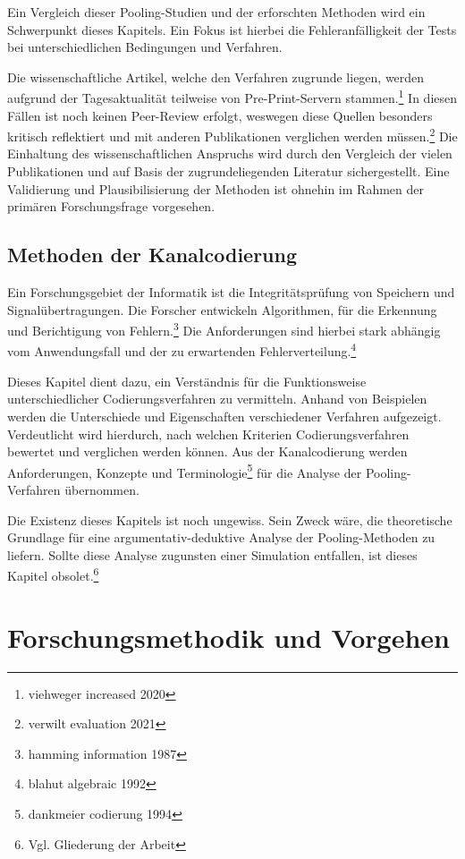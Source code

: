 Ein Vergleich dieser Pooling-Studien und der erforschten Methoden wird ein Schwerpunkt dieses Kapitels.
Ein Fokus ist hierbei die Fehleranfälligkeit der Tests bei unterschiedlichen Bedingungen und Verfahren.

Die wissenschaftliche Artikel, welche den Verfahren zugrunde liegen, werden aufgrund der Tagesaktualität teilweise von Pre-Print-Servern stammen.\footnote{viehweger increased 2020}
In diesen Fällen ist noch keinen Peer-Review erfolgt, weswegen diese Quellen besonders kritisch reflektiert und mit anderen Publikationen verglichen werden müssen.\footnote{verwilt evaluation 2021}
Die Einhaltung des wissenschaftlichen Anspruchs wird durch den Vergleich der vielen Publikationen und auf Basis der zugrundeliegenden Literatur sichergestellt.
Eine Validierung und Plausibilisierung der Methoden ist ohnehin im Rahmen der primären Forschungsfrage vorgesehen.

\subsection{Methoden der Kanalcodierung}
Ein Forschungsgebiet der Informatik ist die Integritätsprüfung von Speichern und Signalübertragungen.
Die Forscher entwickeln Algorithmen, für die Erkennung und Berichtigung von Fehlern.\footnote{hamming information 1987}
Die Anforderungen sind hierbei stark abhängig vom Anwendungsfall und der zu erwartenden Fehlerverteilung.\footnote{blahut algebraic 1992}

Dieses Kapitel dient dazu, ein Verständnis für die Funktionsweise unterschiedlicher Codierungsverfahren zu vermitteln.
Anhand von Beispielen werden die Unterschiede und Eigenschaften verschiedener Verfahren aufgezeigt.
Verdeutlicht wird hierdurch, nach welchen Kriterien Codierungsverfahren bewertet und verglichen werden können.
Aus der Kanalcodierung werden Anforderungen, Konzepte und Terminologie\footnote{dankmeier codierung 1994}
für die Analyse der Pooling-Verfahren übernommen.

Die Existenz dieses Kapitels ist noch ungewiss.
Sein Zweck wäre, die theoretische Grundlage für eine argumentativ-deduktive Analyse der Pooling-Methoden zu liefern.
Sollte diese Analyse zugunsten einer Simulation entfallen, ist dieses Kapitel obsolet.\footnote{Vgl. Gliederung der Arbeit}

\section{Forschungsmethodik und Vorgehen}
